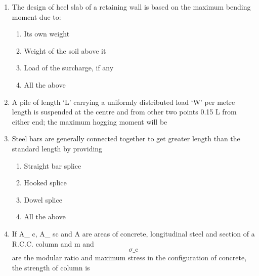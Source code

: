 \documentclass[11pt,a4paper]{article}
\begin{document}
\begin{enumerate}
\begin{enumerate*}[itemjoin=\qquad, label=\Alph*.]
\end{enumerate*}
\item{The design of heel slab of a retaining wall is based on the maximum bending moment due to:}
\begin{enumerate}[label=\Alph*.]
\item{Its own weight}
\item{Weight of the soil above it}
\item{Load of the surcharge, if any}
\item{All the above}
\end{enumerate}
\item{A pile of length `L' carrying a uniformly distributed load `W' per metre length is suspended at the centre and from other two points 0.15 L from either end; the maximum hogging moment will be
}
\\
\item{Steel bars are generally connected together to get greater length than the standard length by providing}
\begin{enumerate}[label=\Alph*.]
\item{Straight bar splice}
\item{Hooked splice}
\item{Dowel splice}
\item{All the above}
\end{enumerate}
\item{If A\_ c, A\_ sc and A are areas of concrete, longitudinal steel and section of a R.C.C. column and m and $${\sigma \_{\text{c}}}$$ are the modular ratio and maximum stress in the configuration of concrete, the strength of column is
}
\\
\end{enumerate}
\end{document}
